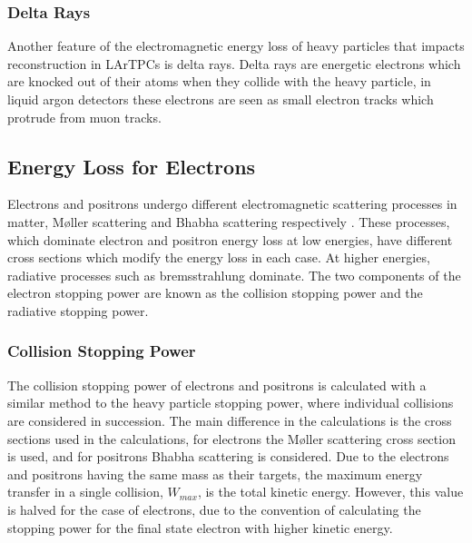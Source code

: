 \subsubsection*{Delta Rays}
Another feature of the electromagnetic energy loss of heavy particles that
impacts reconstruction in LArTPCs is delta rays. Delta rays are energetic
electrons which are knocked out of their atoms when they collide with the heavy
particle, in liquid argon detectors these electrons are seen as small electron 
tracks which protrude from muon tracks. 

\subsection{Energy Loss for Electrons}
Electrons and positrons undergo different electromagnetic scattering processes
in matter, M{\o}ller scattering and Bhabha scattering respectively 
\cite{TODO}. These processes, which dominate electron and positron energy loss 
at low energies, have different cross sections which modify the energy loss in 
each case. At higher energies, radiative processes such as bremsstrahlung 
dominate. The two components of the electron stopping power are known as the 
collision stopping power and the radiative stopping power.

\subsubsection*{Collision Stopping Power}
The collision stopping power of electrons and positrons is calculated with a
similar method to the heavy particle stopping power, where individual collisions
are considered in succession. The main difference in the calculations is the
cross sections used in the calculations, for electrons the M{\o}ller scattering
cross section is used, and for positrons Bhabha scattering is considered. Due to
the electrons and positrons having the same mass as their targets, the maximum 
energy transfer in a single collision, $W_{max}$, is the total kinetic energy. 
However, this value is halved for the case of electrons, due to the convention 
of calculating the stopping power for the final state electron with higher 
kinetic energy.


